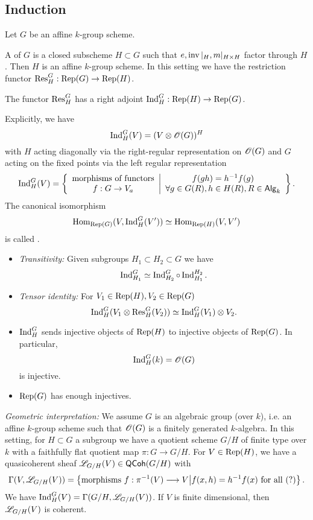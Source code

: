 \subsection{Induction} Let $G$ be an affine $k$-group scheme.

A  of $G$ is a closed subscheme $H\subset G$ such that $e,\operatorname{inv}|_{H},m|_{H\times H}$ factor through $H$. Then $H$ is an affine $k$-group scheme. In this setting we have the restriction functor $\Res_{H}^{G}:\Rep(G)\to \Rep(H)$.

\begin{proposition}
	The functor $\operatorname{Res}_{H}^{G}$ has a right adjoint $\Ind_{H}^{G}:\Rep(H)\to \Rep(G)$.
\end{proposition}
Explicitly, we have
\[
\operatorname{Ind}_{H}^{G}(V) = (V\otimes\mathscr{O}(G))^H
\] 
with $H$ acting diagonally via the right-regular representation on $\mathscr{O}(G)$ and $G$ acting on the fixed points via the left regular representation
\[
	\Ind_{H}^{G}(V) = \left\{ \begin{array}{c} 
		\text{morphisms of functors} \\ 
	f :G\to V_{a}
	\end{array} \middle| \begin{array}{c} 
		f(gh)=h^{-1}f(g) \\
		\forall g\in G(R), h\in H(R), R\in \cat{Alg}_k 
	\end{array} \right\} 
.\] 
The canonical isomorphism
\[
\operatorname{Hom}_{\operatorname{Rep}(G)}(V,\operatorname{Ind}_{H}^{G}(V')) \simeq \operatorname{Hom}_{\operatorname{Rep}(H)}(V,V')
\] 
is called .

\begin{properties} \leavevmode
\begin{itemize}
	\item \emph{Transitivity:} Given subgroups $H_1\subset H_2\subset G$ we have
		\[
		\operatorname{Ind}_{H_1}^{G} \simeq \operatorname{Ind}_{H_2}^{G}\circ \operatorname{Ind}_{H_1}^{H_2}.
		\] 
	\item \emph{Tensor identity:} For $V_1\in \operatorname{Rep}(H),V_2\in \operatorname{Rep}(G)$ 
		\[
		\operatorname{Ind}_{H}^{G}(V_1\otimes\operatorname{Res}_{H}^{G}(V_2)) \simeq \operatorname{Ind}_{H}^{G}(V_1) \otimes V_2.
		\] 
	\item $\operatorname{Ind}_H^{G}$ sends injective objects of $\operatorname{Rep}(H)$ to injective objects of $\operatorname{Rep}(G)$. In particular, 
		\[
			\operatorname{Ind}_H^{G}(k) = \mathscr{O}(G)
		\]
		is injective.
	\item $\operatorname{Rep}(G)$ has enough injectives.
\end{itemize}
\end{properties}

\emph{Geometric interpretation:} We assume $G$ is an algebraic group (over $k$), i.e. an affine $k$-group scheme such that $\mathscr{O}(G)$ is a finitely generated $k$-algebra. In this setting, for $H\subset G$ a subgroup we have a quotient scheme $G /H$ of finite type over $k$ with a faithfully flat quotient map $\pi:G\to G /H$. For $V\in \operatorname{Rep}(H)$, we have a quasicoherent sheaf $\mathscr{L}_{G /H}(V)\in \mathsf{QCoh}(G /H)$ with
\[
\Gamma(V,\CL_{G /H}(V)) = \left\{ \text{morphisms } f:\pi^{-1}(V)\to V \middle| f(x,h)=h^{-1}f(x)\text{ for all }(?)  \right\} 
.\] 
We have $\operatorname{Ind}_{H}^{G}(V) = \Gamma(G /H,\mathscr{L}_{G /H}(V))$. If $V$ is finite dimensional, then $\mathscr{L}_{G /H}(V)$ is coherent.

